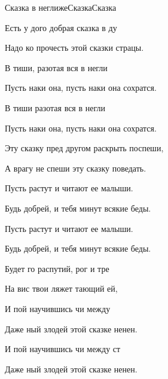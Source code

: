 \documentclass[11pt,a5paper]{book}
\begin{document}
\begin{song}{Сказка в неглиже}{}{Сказка}{Сказка}{}{}
\begin{SBVerse*}
Есть у дого добрая сказка в ду\par 
Надо ко прочесть этой сказки страцы.\par
В тиши, разотая вся в негли\par
Пусть наки она, пусть наки она сохратся. \par 
В тиши разотая вся в негли \par
Пусть наки она, пусть наки она сохратся.
\end{SBVerse*}

Эту сказку пред другом раскрыть поспеши,\par
А врагу не спеши эту сказку поведать.\par
Пусть растут и читают ее малыши.\par
Будь добрей, и тебя минут всякие беды.\par
Пусть растут и читают ее малыши.\par
Будь добрей, и тебя минут всякие беды.

\begin{SBVerse*}
Будет го распутий, рог и тре\par
На вис твои ляжет тающий ей, \par
И пой научившись чи между  \par
Даже ный злодей  этой сказке ненен. \par
И пой научившись чи между ст \par
Даже ный злодей  этой сказке ненен.
\end{SBVerse*}
     \par
{}    
\end{song}
\end{document}
